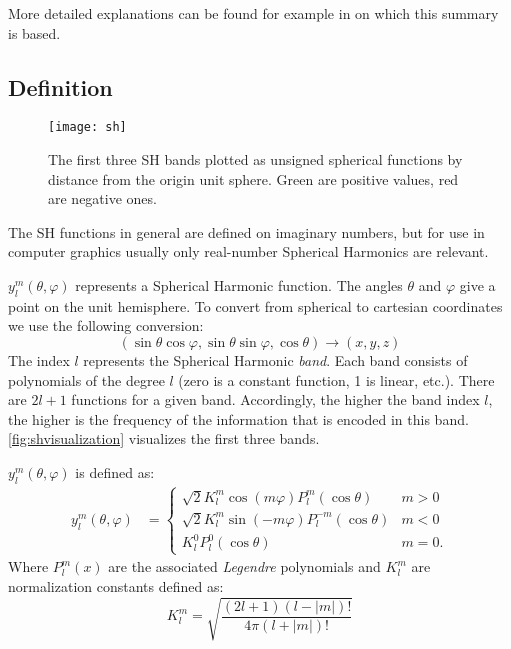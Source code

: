 \documentclass[thesis.tex]{subfiles}
\begin{document}
More detailed explanations can be found for example in \cite{bib:grittysh, bib:stupidsh} on which this summary is based.

\subsection{Definition} \label{chap:sh:def}
\begin{figure}[h]
	\centering
	\texttt{[image: sh]}
	\caption{\cite{bib:grittysh} The first three SH bands plotted as unsigned spherical functions by distance from the origin unit sphere. Green are positive values, red are negative ones.}
	\label{fig:shvisualization}
\end{figure}
The SH functions in general are defined on imaginary numbers, but for use in computer graphics usually only real-number Spherical Harmonics are relevant.

$y^m_l(\theta, \varphi)$ represents a Spherical Harmonic function.
The angles $\theta$ and $\varphi$ give a point on the unit hemisphere.
To convert from spherical to cartesian coordinates we use the following conversion:
\begin{equation} \label{equ:postoangle}
(\sin\theta\cos\varphi, \sin\theta\sin\varphi, \cos\theta) \rightarrow (x,y,z)
\end{equation}
The index $l$ represents the Spherical Harmonic \emph{band}.
Each band consists of polynomials of the degree $l$ (zero is a constant function, 1 is linear, etc.).
There are $2l+1$ functions for a given band.
Accordingly, the higher the band index $l$, the higher is the frequency of the information that is encoded in this band.
\autoref{fig:shvisualization} visualizes the first three bands.

$y^m_l(\theta, \varphi)$ is defined as:
\begin{equation}
	\begin{alignedat}{2}
		y^m_l(\theta, \varphi) &= \begin{cases}
		\sqrt{2}K^m_l \cos(m\varphi) P^m_l(\cos\theta) & m>0\\
		\sqrt{2}K^m_l \sin(-m\varphi) P^{-m}_l(\cos\theta) & m<0\\
		K^0_l P^0_l(\cos\theta) & m=0.\end{cases}
	\end{alignedat}
\end{equation}
Where $P^m_l(x)$ are the associated \emph{Legendre} polynomials and $K^m_l$ are normalization constants defined as:
\begin{equation}
	K^m_l = \sqrt{\frac{(2l+1)(l-|m|)!}{4\pi(l+|m|)!}}
\end{equation}
\end{document}
